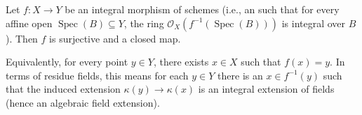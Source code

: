 \begin{theorem} \label{theorem:lying_over_for_integral_morphism_of_schemes}
Let $f : X \to Y$ be an integral morphism of schemes (i.e., an  such that for every affine open $\operatorname{Spec}(B) \subseteq Y$, the ring $\mathcal{O}_X(f^{-1}(\operatorname{Spec}(B)))$ is integral over $B$). Then $f$ is surjective and a closed map.

Equivalently, for every point $y \in Y$, there exists $x \in X$ such that $f(x) = y$. In terms of residue fields, this means for each $y \in Y$ there is an $x \in f^{-1}(y)$ such that the induced extension $\kappa(y) \to \kappa(x)$ is an integral extension of fields (hence an algebraic field extension).
\end{theorem}
